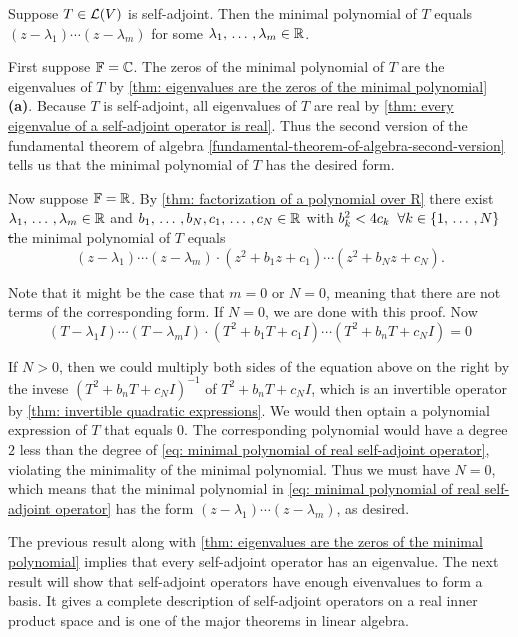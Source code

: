 \begin{thm}
  Suppose $T \in \mathcal{L}(V)$ is self-adjoint. Then the minimal polynomial of $T$ equals $(z-\lambda_1) \cdots (z-\lambda_m)$ for some $\lambda_1, {\, \ldots \,\,}, \lambda_m \in \mathbb{R}$.
\end{thm}
\begin{prf}
  First suppose $\mathbb{F} = \mathbb{C}$. The zeros of the minimal polynomial of $T$ are the eigenvalues of $T$ by \ref{thm: eigenvalues are the zeros of the minimal polynomial} \textbf{(a)}. Because $T$ is self-adjoint, all eigenvalues of $T$ are real by \ref{thm: every eigenvalue of a self-adjoint operator is real}. Thus the second version of the fundamental theorem of algebra \ref{fundamental-theorem-of-algebra-second-version} tells us that the minimal polynomial of $T$ has the desired form.

  Now suppose $\mathbb{F} = \mathbb{R}$. By \ref{thm: factorization of a polynomial over R} there exist $\lambda_1, {\, \ldots \,\,}, \lambda_m \in \mathbb{R}$ and $b_1, {\, \ldots \,\,}, b_N, c_1, {\, \ldots \,\,}, c_N \in \mathbb{R}$ with $b_k^2 < 4c_k \; \; \forall k \in \{1, {\, \ldots \,\,}, N \}$ \st the minimal polynomial of $T$ equals
  \begin{equation}
    \label{eq: minimal polynomial of real self-adjoint operator}
    (z-\lambda_1)\cdots(z-\lambda_m)\cdot(z^2+b_1z+c_1) \cdots (z^2+b_Nz+c_N).
  \end{equation}

  Note that it might be the case that $m=0$ or $N=0$, meaning that there are not terms of the corresponding form. If $N=0$, we are done with this proof. Now
  \[
  (T-\lambda_1I) \cdots (T-\lambda_m I)\cdot(T^2 + b_1 T + c_1I)\cdots(T^2 + b_nT + c_NI) = 0
  \]

  If $N>0$, then we could multiply both sides of the equation above on the right by the invese $(T^2+b_nT+c_NI)^{-1}$ of $T^2+b_nT+c_NI$, which is an invertible operator by \ref{thm: invertible quadratic expressions}. We would then optain a polynomial expression of $T$ that equals $0$. The corresponding polynomial would have a degree $2$ less than the degree of \eqref{eq: minimal polynomial of real self-adjoint operator}, violating the minimality of the minimal polynomial. Thus we must have $N=0$, which means that the minimal polynomial in \eqref{eq: minimal polynomial of real self-adjoint operator} has the form $(z-\lambda_1)\cdots(z-\lambda_m)$, as desired.
\end{prf}

The previous result along with \ref{thm: eigenvalues are the zeros of the minimal polynomial} implies that every self-adjoint operator has an eigenvalue. The next result will show that self-adjoint operators have enough eivenvalues to form a basis. It gives a complete description of self-adjoint operators on a real inner product space and is one of the major theorems in linear algebra.


